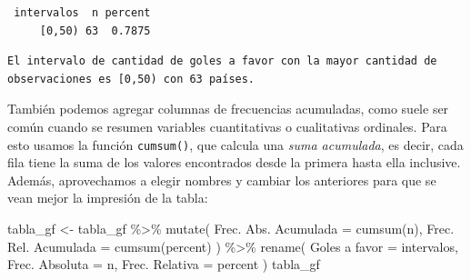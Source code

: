 \documentclass[
]{book}
\newenvironment{Shaded}{\begin{snugshade}}{\end{snugshade}}
\newcommand{\AttributeTok}[1]{\textcolor[rgb]{0.77,0.63,0.00}{#1}}
\newcommand{\FunctionTok}[1]{\textcolor[rgb]{0.00,0.00,0.00}{#1}}
\newcommand{\NormalTok}[1]{#1}
\newcommand{\OtherTok}[1]{\textcolor[rgb]{0.56,0.35,0.01}{#1}}
\newcommand{\SpecialCharTok}[1]{\textcolor[rgb]{0.00,0.00,0.00}{#1}}
\newcommand{\StringTok}[1]{\textcolor[rgb]{0.31,0.60,0.02}{#1}}
\begin{document}
\begin{verbatim}
 intervalos  n percent
     [0,50) 63  0.7875
\end{verbatim}

\begin{Shaded}
\end{Shaded}

\begin{verbatim}
El intervalo de cantidad de goles a favor con la mayor cantidad de observaciones es [0,50) con 63 países.
\end{verbatim}

También podemos agregar columnas de frecuencias acumuladas, como suele ser común cuando se resumen variables cuantitativas o cualitativas ordinales. Para esto usamos la función \texttt{cumsum()}, que calcula una \emph{suma acumulada}, es decir, cada fila tiene la suma de los valores encontrados desde la primera hasta ella inclusive. Además, aprovechamos a elegir nombres y cambiar los anteriores para que se vean mejor la impresión de la tabla:

\begin{Shaded}
\begin{Highlighting}[]
\NormalTok{tabla\_gf }\OtherTok{\textless{}{-}} 
\NormalTok{    tabla\_gf }\SpecialCharTok{\%\textgreater{}\%} 
    \FunctionTok{mutate}\NormalTok{(}
        \StringTok{\textasciigrave{}}\AttributeTok{Frec. Abs. Acumulada}\StringTok{\textasciigrave{}} \OtherTok{=} \FunctionTok{cumsum}\NormalTok{(n),}
        \StringTok{\textasciigrave{}}\AttributeTok{Frec. Rel. Acumulada}\StringTok{\textasciigrave{}} \OtherTok{=} \FunctionTok{cumsum}\NormalTok{(percent)}
\NormalTok{    ) }\SpecialCharTok{\%\textgreater{}\%} 
    \FunctionTok{rename}\NormalTok{(}
        \StringTok{\textasciigrave{}}\AttributeTok{Goles a favor}\StringTok{\textasciigrave{}} \OtherTok{=}\NormalTok{ intervalos,}
        \StringTok{\textasciigrave{}}\AttributeTok{Frec. Absoluta}\StringTok{\textasciigrave{}} \OtherTok{=}\NormalTok{ n, }
        \StringTok{\textasciigrave{}}\AttributeTok{Frec. Relativa}\StringTok{\textasciigrave{}} \OtherTok{=}\NormalTok{ percent}
\NormalTok{    )}
\NormalTok{tabla\_gf}
\end{Highlighting}
\end{Shaded}
\end{document}
